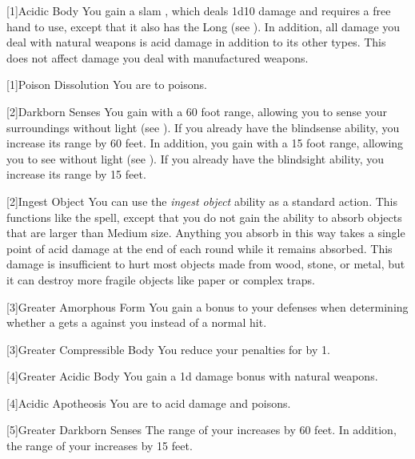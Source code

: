             [1]{Acidic Body} You gain a slam , which deals 1d10 damage and requires a free hand to use, except that it also has the Long  (see ).
            In addition, all damage you deal with natural weapons is acid damage in addition to its other types.
            This does not affect damage you deal with manufactured weapons.

            [1]{Poison Dissolution} You are  to poisons.

            [2]{Darkborn Senses} You gain  with a 60 foot range, allowing you to sense your surroundings without light (see ).
            If you already have the blindsense ability, you increase its range by 60 feet.
            In addition, you gain  with a 15 foot range, allowing you to see without light (see ).
            If you already have the blindsight ability, you increase its range by 15 feet.

            [2]{Ingest Object} You can use the \textit{ingest object} ability as a standard action.
            This functions like the  spell, except that you do not gain the ability to absorb objects that are larger than Medium size.
            Anything you absorb in this way takes a single point of  acid damage at the end of each round while it remains absorbed.
            This damage is insufficient to hurt most objects made from wood, stone, or metal, but it can destroy more fragile objects like paper or complex traps.

            [3]{Greater Amorphous Form} You gain a  bonus to your defenses when determining whether a  gets a  against you instead of a normal hit.

            [3]{Greater Compressible Body} You reduce your penalties for \squeezing by 1.

            [4]{Greater Acidic Body} You gain a \plus1d damage bonus with natural weapons.

            [4]{Acidic Apotheosis} You are  to acid damage and poisons.

            [5]{Greater Darkborn Senses} The range of your  increases by 60 feet.
            In addition, the range of your  increases by 15 feet.

